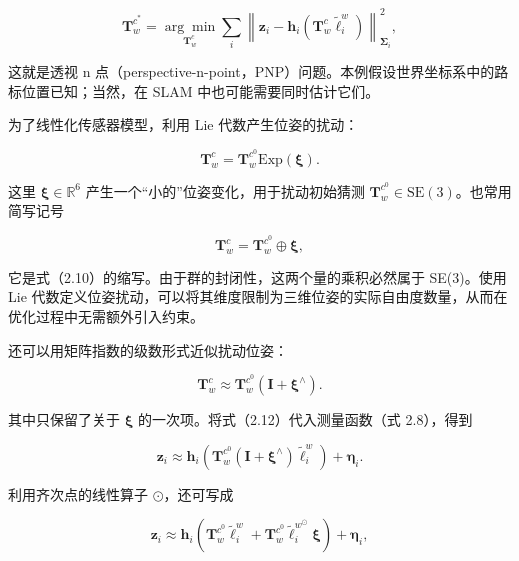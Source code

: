 \begin{equation}
\boldsymbol {T} _ {w} ^ {c ^ {*}} = \underset {\boldsymbol {T} _ {w} ^ {c}} {\arg \min} \sum_ {i} \left\| \boldsymbol {z} _ {i} - \boldsymbol {h} _ {i} \left(\boldsymbol {T} _ {w} ^ {c} \tilde {\ell} _ {i} ^ {w}\right) \right\| _ {\boldsymbol {\Sigma} _ {i}} ^ {2},\tag{2.9}
\end{equation}

这就是透视 n 点（perspective-n-point，PNP）问题。本例假设世界坐标系中的路标位置已知；当然，在 SLAM 中也可能需要同时估计它们。

为了线性化传感器模型，利用 Lie 代数产生位姿的扰动：

\begin{equation}
\pmb {T} _ {w} ^ {c} = \pmb {T} _ {w} ^ {c ^ {0}} \mathrm{Exp} (\pmb {\xi}).\tag{2.10}
\end{equation}

这里 $\pmb\xi\in\mathbb{R}^6$ 产生一个“小的”位姿变化，用于扰动初始猜测 $\pmb T_w^{c^0}\in\mathrm{SE}(3)$。也常用简写记号

\begin{equation}
\pmb {T} _ {w} ^ {c} = \pmb {T} _ {w} ^ {c ^ {0}} \oplus \pmb {\xi},\tag{2.11}
\end{equation}

它是式（2.10）的缩写。由于群的封闭性，这两个量的乘积必然属于 SE(3)。使用 Lie 代数定义位姿扰动，可以将其维度限制为三维位姿的实际自由度数量，从而在优化过程中无需额外引入约束。

还可以用矩阵指数的级数形式近似扰动位姿：

\begin{equation}
\boldsymbol {T} _ {w} ^ {c} \approx \boldsymbol {T} _ {w} ^ {c ^ {0}} \left(\mathbf {I} + \boldsymbol {\xi} ^ {\wedge}\right).\tag{2.12}
\end{equation}

其中只保留了关于 $\pmb\xi$ 的一次项。将式（2.12）代入测量函数（式 2.8），得到

\begin{equation}
\boldsymbol {z} _ {i} \approx \boldsymbol {h} _ {i} \left(\boldsymbol {T} _ {w} ^ {c ^ {0}} \left(\mathbf {I} + \boldsymbol {\xi} ^ {\wedge}\right) \tilde {\ell} _ {i} ^ {w}\right) + \boldsymbol {\eta} _ {i}.\tag{2.13}
\end{equation}

利用齐次点的线性算子 $\odot$，还可写成

\begin{equation}
\boldsymbol {z} _ {i} \approx \boldsymbol {h} _ {i} \left(\boldsymbol {T} _ {w} ^ {c ^ {0}} \tilde {\ell} _ {i} ^ {w} + \boldsymbol {T} _ {w} ^ {c ^ {0}} \tilde {\ell} _ {i} ^ {w ^ {\odot}} \boldsymbol {\xi}\right) + \boldsymbol {\eta} _ {i},\tag{2.14}
\end{equation}

